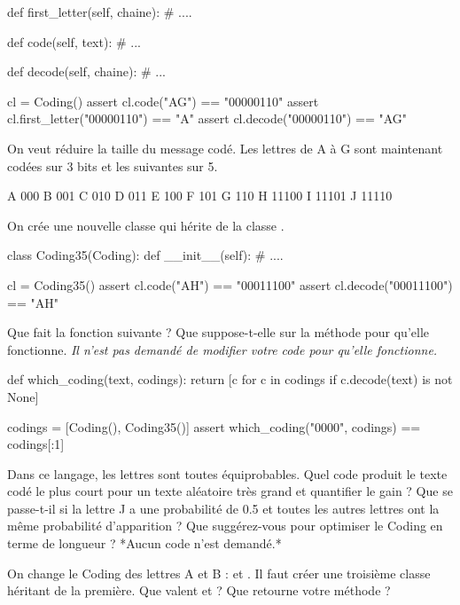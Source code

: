 \begin{xexercice}
\begin{verbatimx}
    def first_letter(self, chaine):
        # ....

    def code(self, text):
        # ...

    def decode(self, chaine):
        # ...

cl = Coding()
assert cl.code("AG") == "00000110"
assert cl.first_letter("00000110") == "A"
assert cl.decode("00000110") == "AG"
\end{verbatimx}

\exequest On veut réduire la taille du message codé.
Les lettres de A à G sont maintenant codées sur 3 bits et les suivantes sur 5.

\begin{verbatimx}
A 000
B 001
C 010
D 011
E 100
F 101
G 110
H 11100
I 11101
J 11110
\end{verbatimx}

On crée une nouvelle classe  qui hérite de la classe .

\begin{verbatimx}
class Coding35(Coding):
    def __init__(self):
        # ....

cl = Coding35()
assert cl.code("AH") == "00011100"
assert cl.decode("00011100") == "AH"
\end{verbatimx}

\exequest Que fait la fonction suivante ? Que suppose-t-elle sur la méthode  pour qu'elle fonctionne.
\textit{Il n'est pas demandé de modifier votre code pour qu'elle fonctionne.}

\begin{verbatimx}
def which_coding(text, codings):
    return [c for c in codings if c.decode(text) is not None]

codings = [Coding(), Coding35()]
assert which_coding("0000", codings) == codings[:1]
\end{verbatimx}

\exequest Dans ce langage, les lettres sont toutes équiprobables.
Quel code produit le texte codé le plus court pour un texte aléatoire très grand et quantifier le gain ?
Que se passe-t-il si la lettre J a une probabilité de 0.5 et toutes les autres lettres ont la même probabilité
d'apparition ? Que suggérez-vous pour optimiser le Coding en terme de longueur ?
*Aucun code n'est demandé.*

\exequest On change le Coding des lettres A et B :  et . Il faut créer une troisième classe
héritant de la première. Que valent  et  ?
Que retourne votre méthode  ?


\end{xexercice}
